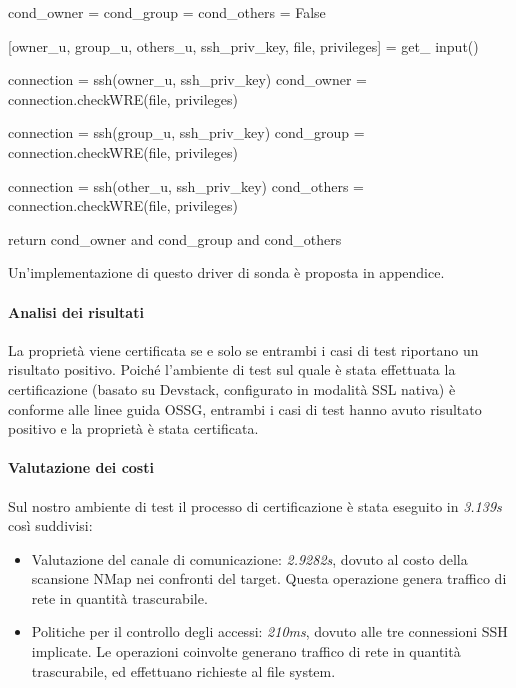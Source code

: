 \documentclass[../main.tex]{subfiles}
\begin{document}
\begin{itemize}
\begin{python}
cond_owner = cond_group = cond_others = False

[owner_u, group_u, others_u, ssh_priv_key, file, privileges] = get_ input()

connection = ssh(owner_u, ssh_priv_key)
cond_owner = connection.checkWRE(file, privileges)

connection = ssh(group_u, ssh_priv_key)
cond_group = connection.checkWRE(file, privileges)

connection = ssh(other_u, ssh_priv_key)
cond_others = connection.checkWRE(file, privileges)

return cond_owner and cond_group and cond_others
\end{python}

Un'implementazione di questo driver di sonda è proposta in appendice.

\end{itemize}
\paragraph{Analisi dei risultati}
La proprietà viene certificata se e solo se entrambi i casi di test riportano un risultato positivo.
Poiché l'ambiente di test sul quale è stata effettuata la certificazione (basato su Devstack, configurato in modalità SSL nativa) è conforme alle linee guida OSSG, entrambi i casi di test hanno avuto risultato positivo e la proprietà è stata certificata.

\paragraph{Valutazione dei costi}
Sul nostro ambiente di test il processo di certificazione è stata eseguito in \textit{3.139s} così suddivisi:
\begin{itemize}
\item Valutazione del canale di comunicazione: \textit{2.9282s}, dovuto al costo della scansione NMap nei confronti del target. Questa operazione genera traffico di rete in quantità trascurabile.
\item Politiche per il controllo degli accessi: \textit{210ms}, dovuto alle tre connessioni SSH implicate. Le operazioni coinvolte generano traffico di rete in quantità trascurabile, ed effettuano richieste al file system.
\end{itemize}
\end{document}
